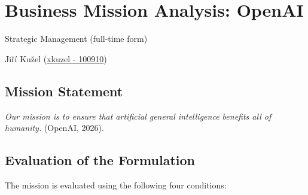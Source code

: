 \documentclass[
  a4paper,
]{article}
\author{}
\date{}
\begin{document}
\section{Business Mission Analysis:
OpenAI}\label{business-mission-analysis-openai}

\begin{center}
Strategic Management (full-time form)

Jiří Kužel
(\href{https://is.mendelu.cz/auth/lide/clovek.pl?id=100910}{xkuzel -
100910})
\end{center}

\subsection{Mission Statement}\label{mission-statement}

\emph{Our mission is to ensure that artificial general intelligence
benefits all of humanity.} (OpenAI, 2026).


\subsection{Evaluation of the
Formulation}\label{evaluation-of-the-formulation}

The mission is evaluated using the following four conditions:
\end{document}
